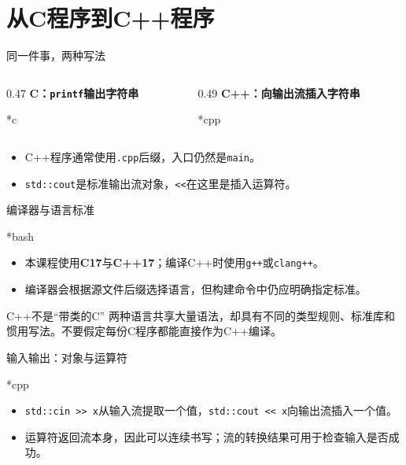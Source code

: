 \section{从C程序到C++程序}

\begin{frame}{同一件事，两种写法}
\begin{columns}[T]
\begin{column}{0.47\textwidth}
\textbf{C：\texttt{printf}输出字符串}
\begin{Code}*{c}\end{Code}
\end{column}
\begin{column}{0.49\textwidth}
\textbf{C++：向输出流插入字符串}
\begin{Code}*{cpp}\end{Code}
\end{column}
\end{columns}
\medskip
\begin{itemize}
\item C++程序通常使用\texttt{.cpp}后缀，入口仍然是\texttt{main}。
\item \texttt{std::cout}是标准输出流对象，\texttt{<<}在这里是插入运算符。
\end{itemize}
\end{frame}

\begin{frame}{编译器与语言标准}
\begin{Code}*{bash}\end{Code}
\begin{itemize}
\item 本课程使用\textbf{C17}与\textbf{C++17}；编译C++时使用\texttt{g++}或\texttt{clang++}。
\item 编译器会根据源文件后缀选择语言，但构建命令中仍应明确指定标准。
\end{itemize}
\medskip
\begin{vspquotered}{C++不是“带类的C”}
\small 两种语言共享大量语法，却具有不同的类型规则、标准库和惯用写法。不要假定每份C程序都能直接作为C++编译。
\end{vspquotered}
\end{frame}

\begin{frame}{输入输出：对象与运算符}
\begin{Code}*{cpp}\end{Code}
\begin{itemize}
\item \texttt{std::cin >> x}从输入流提取一个值，\texttt{std::cout << x}向输出流插入一个值。
\item 运算符返回流本身，因此可以连续书写；流的转换结果可用于检查输入是否成功。
\end{itemize}
\end{frame}

